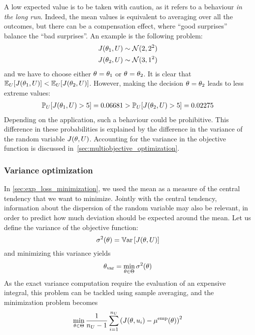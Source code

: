 \documentclass[../../Main_ManuscritThese.tex]{subfiles}
\begin{document}
A low expected value is to be taken with caution, as it refers to a behaviour \emph{in the long run}. Indeed, the mean values is equivalent to averaging over all the outcomes, but there can be a compensation effect, where ``good surprises'' balance the ``bad surprises''.
An example is the following problem:
\begin{align}
  J(\theta_1, U) &\sim \mathcal{N}(2, 2^2) \\
  J(\theta_2, U) & \sim \mathcal{N}(3, 1^2)
\end{align}
and we have to choose either ${\theta}_{\mathrm{}}=\theta_1$ or ${\theta}_{\mathrm{}} = \theta_2$.
It is clear that $\mathbb{E}_{U}[J(\theta_1, U)] < \mathbb{E}_{U}[J(\theta_2, U)]$. However, making the decision ${\theta}_{\mathrm{}} = \theta_2$ leads to less extreme values:
\begin{align}
  \mathbb{P}_{U}[J(\theta_1, U) > 5] = 0.06681> \mathbb{P}_{U}[J(\theta_2, U) > 5] = 0.02275
\end{align}
Depending on the application, such a behaviour could be prohibitive.
This difference in these probabilities is explained by the difference in the variance of the random variable $J(\theta, U)$.
Accounting for the variance in the objective function is discussed in~\cref{sec:multiobjective_optimization}.

\subsubsection{Variance optimization}
In \cref{sec:exp_loss_minimization}, we used the mean as a measure of the central tendency that we want to minimize. Jointly with the central tendency, information about the dispersion of the random variable may also be relevant, in order to predict how much deviation should be expected around the mean.
Let us define the variance of the objective function:
\begin{equation}
  \sigma^2(\theta) = \mathbb{V}\mathrm{ar}\left[J(\theta,U)\right]
\end{equation}
and minimizing this variance yields
\begin{equation}
  {\theta}_{\mathrm{var}} = \min_{\theta \in \Theta} \sigma^2(\theta)
\end{equation}
As the exact variance computation require the evaluation of an expensive integral, this problem can be tackled using sample averaging, and the minimization problem becomes
\begin{equation}
  \min_{\theta\in \Theta} \frac{1}{n_{U}-1} \sum_{i=1}^{n_{U}} \left(J(\theta, u_i) - \mu^{\mathrm{emp}}(\theta)\right)^2
\end{equation}
\end{document}
